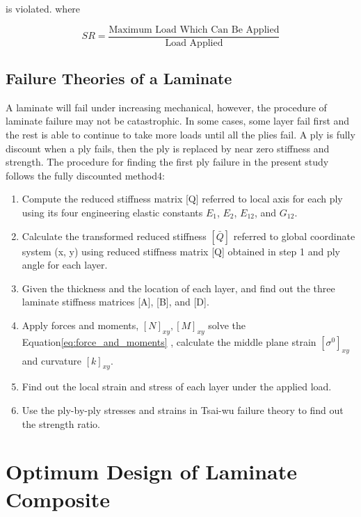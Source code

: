 \documentclass[USenglish]{article}
\begin{document}
is violated. where

\begin{equation} \label{eq:sr}S R=\frac{\text {Maximum Load Which Can Be Applied}}{\text {Load Applied}}
\end{equation}


\subsection{Failure Theories of a Laminate}
A laminate will fail under increasing mechanical, however, the procedure of laminate failure may not
be catastrophic. In some cases, some layer fail first and the rest is able to continue to take more
loads until all the plies fail. A ply is fully discount when a ply fails, then the ply is replaced
by near zero stiffness and strength. The procedure for finding the first ply failure in the present
study follows the fully discounted method4:

\begin{enumerate}
	\item Compute the reduced stiffness matrix [Q] referred to local axis for each ply using its four engineering elastic constants $E_1 $, $E_2 $, $E_{12} $, and $G_{12} $.

	\item Calculate the transformed reduced stiffness $[\bar{Q}] $ referred to global coordinate system (x, y) using reduced stiffness matrix [Q] obtained in step 1 and ply angle for each layer.

	\item  Given the thickness and the location of each layer, and find out the three laminate stiffness matrices [A], [B], and [D].

	\item  Apply forces and moments, $[N]_{xy}, [M]_{xy} $ solve the
		Equation\ref{eq:force_and_moments} , calculate the middle plane strain $[\sigma ^{0}]_{xy} $ and curvature $[k]_{xy} $.

	\item Find out the local strain and stress of each layer under the applied load.

	\item  Use the ply-by-ply stresses and strains in Tsai-wu failure theory to find out the strength ratio.
\end{enumerate}



    
\section{Optimum Design of Laminate Composite}
\end{document}
